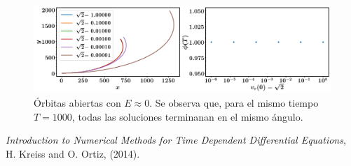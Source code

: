 \documentclass[12pt]{article}
\begin{document}
\begin{figure}
\centering
\includegraphics[scale=0.3]{last_phi.png}
\caption{\label{fig:last_phi} \'Orbitas abiertas con $E\approx 0$. Se observa que, para el mismo tiempo $T=1000$, todas las soluciones terminanan en el mismo \'angulo.}
\end{figure}



\begin{thebibliography}{1}

 {\em Introduction to Numerical Methods for Time Dependent Differential Equations}, H. Kreiss and O. Ortiz, (2014).

\end{thebibliography}
\end{document}
